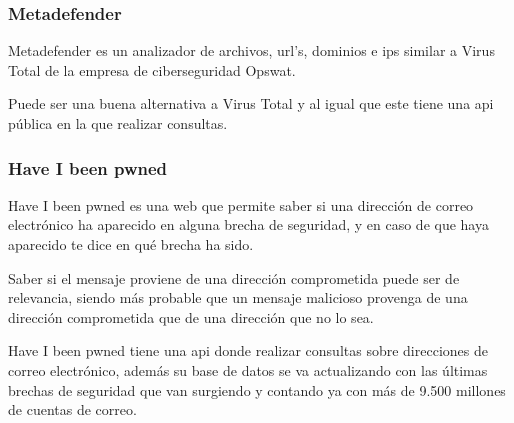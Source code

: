 \subsubsection{Metadefender}
Metadefender \cite{metadefender} es un analizador de archivos, url’s, dominios e ips similar a Virus Total de la empresa de ciberseguridad Opswat.

Puede ser una buena alternativa a Virus Total y al igual que este tiene una api pública \cite{metadefender_api} en la que realizar consultas. 

\subsubsection{Have I been pwned}
Have I been pwned \cite{Have_I_been_pwned} es una web que permite saber si una dirección de correo electrónico ha aparecido en alguna brecha de seguridad, y en caso de que haya aparecido te dice en qué brecha ha sido.

Saber si el mensaje proviene de una dirección comprometida puede ser de relevancia, siendo más probable que un mensaje malicioso provenga de una dirección comprometida que de una dirección que no lo sea. 

Have I been pwned tiene una api \cite{Have_I_been_pwned_api} donde realizar consultas sobre direcciones de correo electrónico, además su base de datos se va actualizando con las últimas brechas de seguridad que van surgiendo y contando ya con más de 9.500 millones de cuentas de correo.

